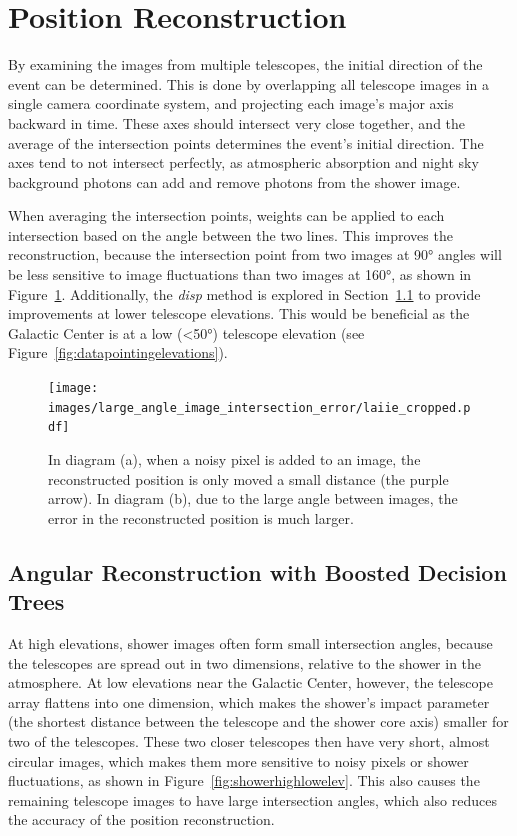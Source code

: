 \section{Position Reconstruction}\label{subsec:posrecon}
By examining the images from multiple telescopes, the initial direction of the event can be determined.
This is done by overlapping all telescope images in a single camera coordinate system, and projecting each image's major axis backward in time.
These axes should intersect very close together, and the average of the intersection points determines the event's initial direction.
The axes tend to not intersect perfectly, as atmospheric absorption and night sky background photons can add and remove photons from the shower image.

When averaging the intersection points, weights can be applied to each intersection based on the angle between the two lines.
This improves the reconstruction, because the intersection point from two images at \ang{90} angles will be less sensitive to image fluctuations than two images at \ang{160}, as shown in Figure~\ref{fig:largeintersectangle}.
Additionally, the \textit{disp} method is explored in Section~\ref{subsec:disp} to provide improvements at lower telescope elevations.
This would be beneficial as the Galactic Center is at a low (<\ang{50}) telescope elevation (see Figure~\ref{fig:datapointingelevations}).

\begin{figure}[!t]
  \centering
  \texttt{[image: images/large\_angle\_image\_intersection\_error/laiie\_cropped.pdf]}
  \caption[Large Image Intersection Angles]{
    In diagram (a), when a noisy pixel is added to an image, the reconstructed position is only moved a small distance (the purple arrow).
    In diagram (b), due to the large angle between images, the error in the reconstructed position is much larger.
  }
  \label{fig:largeintersectangle}
\end{figure}
\FloatBarrier

\subsection{Angular Reconstruction with Boosted Decision Trees}\label{subsec:disp}
At high elevations, shower images often form small intersection angles, because the telescopes are spread out in two dimensions, relative to the shower in the atmosphere.
At low elevations near the Galactic Center, however, the telescope array flattens into one dimension, which makes the shower's impact parameter (the shortest distance between the telescope and the shower core axis) smaller for two of the telescopes.
These two closer telescopes then have very short, almost circular images, which makes them more sensitive to noisy pixels or shower fluctuations, as shown in Figure~\ref{fig:showerhighlowelev}.
This also causes the remaining telescope images to have large intersection angles, which also reduces the accuracy of the position reconstruction.

